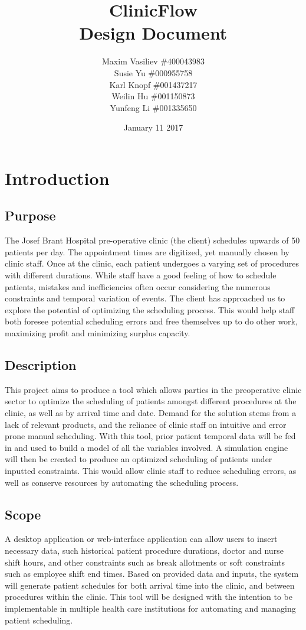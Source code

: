 \documentclass[12pt]{article}
\title{
ClinicFlow
\\\vspace{10mm}
\large \textbf{Design Document}
\vspace{40mm}
}
\author{ Maxim Vasiliev \#400043983\\
Susie Yu \#000955758\\
Karl Knopf \#001437217\\
Weilin Hu \#001150873\\
Yunfeng Li \#001335650
}
\date{January 11 2017}
\begin{document}
\maketitle
\newpage
\tableofcontents
\newpage
{}


\section{Introduction}

\subsection{Purpose}
The Josef Brant Hospital pre-operative clinic (the client) schedules upwards of 50 patients per day. The appointment times are digitized, yet manually chosen by clinic staff. Once at the clinic, each patient undergoes a varying set of procedures with different durations. While staff have a good feeling of how to schedule patients, mistakes and inefficiencies often occur considering the numerous constraints and temporal variation of events. The client has approached us to explore the potential of optimizing the scheduling process. This would help staff both foresee potential scheduling errors and free themselves up to do other work, maximizing profit and minimizing surplus capacity.

\subsection{Description}
This project aims to produce a tool which allows parties in the preoperative clinic sector to optimize the scheduling of patients amongst different procedures at the clinic, as well as by arrival time and date. Demand for the solution stems from a lack of relevant products, and the reliance of clinic staff on intuitive and error prone manual scheduling. With this tool, prior patient temporal data will be fed in and used to build a model of all the variables involved. A simulation engine will then be created to produce an optimized scheduling of patients under inputted constraints. This would allow clinic staff to reduce scheduling errors, as well as conserve resources by automating the scheduling process.

\subsection{Scope}
A desktop application or web-interface application can allow users to insert necessary data, such historical patient procedure durations, doctor and nurse shift hours, and other constraints such as break allotments or soft constraints such as employee shift end times. Based on provided data and inputs, the system will generate patient schedules for both arrival time into the clinic, and between procedures within the clinic. This tool will be designed with the intention to be implementable in multiple health care institutions for automating and managing patient scheduling.
\newpage
\end{document}
